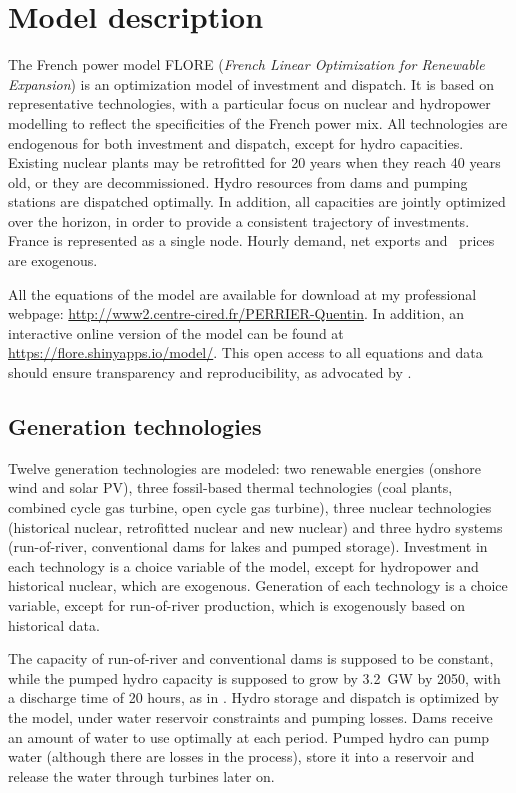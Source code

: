 \section{Model description} \label{sec:modelDescription}

The French power model FLORE (\textit{French Linear Optimization for Renewable Expansion}) is an optimization model of investment and dispatch. It is based on representative technologies, with a particular focus on nuclear and hydropower modelling to reflect the specificities of the French power mix. All technologies are endogenous for both investment and dispatch, except for hydro capacities. Existing nuclear plants may be retrofitted for 20 years when they reach 40 years old, or they are decommissioned. Hydro resources from dams and pumping stations are dispatched optimally. In addition, all capacities are jointly optimized over the horizon, in order to provide a consistent trajectory of investments. France is represented as a single node. Hourly demand, net exports and \coo\ prices are exogenous. 

All the equations of the model are available for download at my professional webpage: \url{http://www2.centre-cired.fr/PERRIER-Quentin}. 
In addition, an interactive online version of the model can be found at \url{https://flore.shinyapps.io/model/}. 
This open access to all equations and data should ensure transparency and reproducibility, as advocated by \citet{Pfenninger2017}.

\subsection{Generation technologies}

Twelve generation technologies are modeled: two renewable energies (onshore wind and solar PV), three fossil-based thermal technologies (coal plants, combined cycle gas turbine, open cycle gas turbine), three nuclear technologies (historical nuclear, retrofitted nuclear and new nuclear) and three hydro systems (run-of-river, conventional dams for lakes and pumped storage).
Investment in each technology is a choice variable of the model, except for hydropower and historical nuclear, which are exogenous.
Generation of each technology is a choice variable, except for run-of-river production, which is exogenously based on historical data.

The capacity of run-of-river and conventional dams is supposed to be constant, while the pumped hydro capacity is supposed to grow by 3.2~GW by 2050, with a discharge time of 20 hours, as in \citet{ADEME2013}.
Hydro storage and dispatch is optimized by the model, under water reservoir constraints and pumping losses.
Dams receive an amount of water to use optimally at each period.
Pumped hydro can pump water (although there are losses in the process), store it into a reservoir and release the water through turbines later on.


